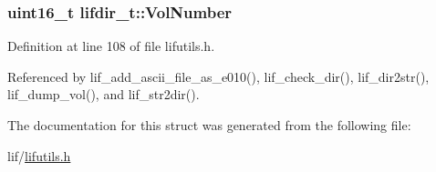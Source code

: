 \subsubsection[{\texorpdfstring{Vol\+Number}{VolNumber}}]{\setlength{\rightskip}{0pt plus 5cm}uint16\+\_\+t lifdir\+\_\+t\+::\+Vol\+Number}\hypertarget{structlifdir__t_a30c6a4231c58d2d43dc31e06bda5a687}{}\label{structlifdir__t_a30c6a4231c58d2d43dc31e06bda5a687}


Definition at line 108 of file lifutils.\+h.



Referenced by lif\+\_\+add\+\_\+ascii\+\_\+file\+\_\+as\+\_\+e010(), lif\+\_\+check\+\_\+dir(), lif\+\_\+dir2str(), lif\+\_\+dump\+\_\+vol(), and lif\+\_\+str2dir().



The documentation for this struct was generated from the following file\+:\begin{DoxyCompactItemize}
\item 
lif/\hyperlink{lifutils_8h}{lifutils.\+h}\end{DoxyCompactItemize}
